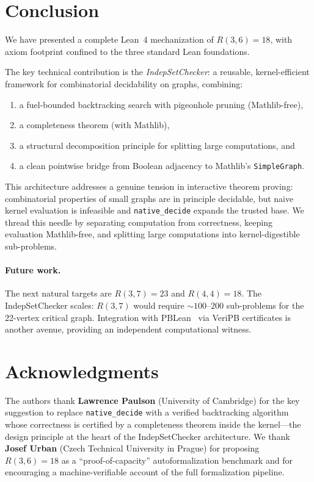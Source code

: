 \documentclass[11pt]{article}
\newcommand{\lean}[1]{\texttt{#1}}
\begin{document}
\section{Conclusion}
\label{sec:conclusion}

We have presented a complete Lean~4 mechanization of $R(3,6) = 18$,
with axiom footprint confined to the three standard Lean foundations.

The key technical contribution is the \emph{IndepSetChecker}: a reusable,
kernel-efficient framework for combinatorial decidability on graphs,
combining:
\begin{enumerate}
\item a fuel-bounded backtracking search with pigeonhole pruning (Mathlib-free),
\item a completeness theorem (with Mathlib),
\item a structural decomposition principle for splitting large computations, and
\item a clean pointwise bridge from Boolean adjacency to Mathlib's \lean{SimpleGraph}.
\end{enumerate}

\noindent
This architecture addresses a genuine tension in interactive theorem proving:
combinatorial properties of small graphs are in principle decidable,
but naive kernel evaluation is infeasible and \lean{native\_decide} expands
the trusted base.
We thread this needle by separating computation from correctness,
keeping evaluation Mathlib-free, and splitting large computations into
kernel-digestible sub-problems.

\paragraph{Future work.}
The next natural targets are $R(3,7) = 23$ and $R(4,4) = 18$.
The IndepSetChecker scales: $R(3,7)$ would require $\sim\!100$--$200$
sub-problems for the 22-vertex critical graph.
Integration with PBLean~\cite{pblean} via VeriPB certificates is another
avenue, providing an independent computational witness.

\section*{Acknowledgments}

The authors thank \textbf{Lawrence Paulson} (University of Cambridge) for
the key suggestion to replace \lean{native\_decide} with a verified
backtracking algorithm whose correctness is certified by a completeness theorem
inside the kernel---the design principle at the heart of the IndepSetChecker
architecture.
We thank \textbf{Josef Urban} (Czech Technical University in Prague) for
proposing $R(3,6) = 18$ as a ``proof-of-capacity'' autoformalization
benchmark and for encouraging a machine-verifiable account of the full
formalization pipeline.
\end{document}
